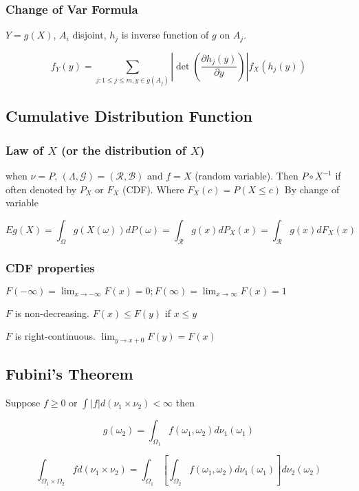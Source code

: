 \subsubsection{Change of Var Formula}

$Y=g(X)$, $A_i$ disjoint, $h_j$ is inverse function of $g$ on $A_j$.

$$f_Y(y)=\sum_{j:1\leq j \leq m, y\in g(A_j)}\left|\det\left(\frac{\partial h_j(y)}{\partial y}\right)\right| f_X(h_j(y))$$

\subsection{Cumulative Distribution Function}

\subsubsection{Law of $X$ (or the distribution of $X$)} when $\nu = P$, $(\Lambda, \mathcal{G}) = (\mathcal{R}, \mathcal{B})$ and $f=X$ (random variable).
Then $P\circ X^{-1}$ if often denoted by $P_X$ or $F_X$ (CDF). Where $F_X(c) = P(X\leq c)$ By change of variable

$$
E g(X) = \int_\Omega g(X(\omega)) dP(\omega) = \int_\mathcal{R} g(x) dP_X(x)  = \int_\mathcal{R} g(x) dF_X(x)
$$

\subsubsection{CDF properties}

$F(-\infty) = \lim_{x\rightarrow -\infty}F(x) = 0; F(\infty)  = \lim_{x\rightarrow \infty}F(x) = 1$

$F$ is non-decreasing. $F(x) \leq F(y)$ if $x \leq y$

$F$ is right-continuous. $\lim_{y\rightarrow x + 0} F(y) = F(x)$

\subsection{Fubini's Theorem}

Suppose $f\geq 0$ or $\int |f|d(\nu_1 \times \nu_2) < \infty$ then

$$
g(\omega_2) = \int_{\Omega_1} f(\omega_1, \omega_2) d\nu_1(\omega_1)
$$

$$
\int_{\Omega_1 \times \Omega_2} f d(\nu_1 \times \nu_2) = \int_{\Omega_1}\left[ \int_{\Omega_2} f(\omega_1, \omega_2) d\nu_1(\omega_1) \right] d\nu_2(\omega_2)
$$

